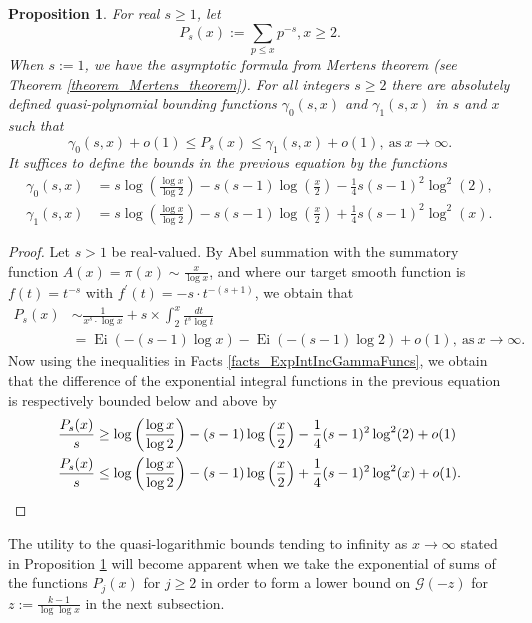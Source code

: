\documentclass[11pt,reqno,a4letter]{article}
\numberwithin{figure}{section}
\numberwithin{table}{section}
\theoremstyle{plain}
\newtheorem{prop}[theorem]{Proposition}
\numberwithin{theorem}{section}
\theoremstyle{definition}
\newcommand{\NBRef}[1]{}
\begin{document}
\begin{prop} 
\label{cor_PartialSumsOfReciprocalsOfPrimePowers} 
For real $s \geq 1$, let 
\[
P_s(x) := \sum_{p \leq x} p^{-s}, x \geq 2. 
\]
When $s := 1$, we have the asymptotic formula from Mertens theorem 
(see Theorem \ref{theorem_Mertens_theorem}). 
For all integers $s \geq 2$ 
there are absolutely defined quasi-polynomial bounding functions 
$\gamma_0(s, x)$ and $\gamma_1(s, x)$ in $s$ and $x$ such that 
\[
\gamma_0(s, x) + o(1) \leq P_s(x) \leq \gamma_1(s, x) + o(1), \mathrm{\ as\ } x \rightarrow \infty. 
\] 
It suffices to define the bounds in the previous equation by the functions 
\begin{align*} 
\gamma_0(s, x) & = s\log\left(\frac{\log x}{\log 2}\right) - 
     s(s-1) \log\left(\frac{x}{2}\right) - 
     \frac{1}{4} s(s-1)^2 \log^2(2), \\ 
\gamma_1(s, x) & = s\log\left(\frac{\log x}{\log 2}\right) - s(s-1) \log\left(\frac{x}{2}\right) + 
     \frac{1}{4} s(s-1)^2 \log^2(x). 
\end{align*}
\end{prop} 
\NBRef{A05-2020-04-26} 
\begin{proof} 
Let $s > 1$ be real-valued. 
By Abel summation with the summatory function 
$A(x) = \pi(x) \sim \frac{x}{\log x}$, and where 
our target smooth function is $f(t) = t^{-s}$ with 
$f^{\prime}(t) = -s \cdot t^{-(s+1)}$, we obtain that 
\begin{align*} 
P_s(x) & \sim \frac{1}{x^s \cdot \log x} + s \times \int_2^{x} \frac{dt}{t^s \log t} \\ 
     & = \operatorname{Ei}(-(s-1) \log x) - \operatorname{Ei}(-(s-1) \log 2) + o(1), 
     \mathrm{\ as\ } x \rightarrow \infty. 
\end{align*} 
Now using the inequalities in Facts \ref{facts_ExpIntIncGammaFuncs}, we obtain that the 
difference of the exponential integral functions in the previous equation 
is respectively bounded below and above by 
\begin{align*} 
\frac{P_s(x)}{s} & \geq \log\left(\frac{\log x}{\log 2}\right) - (s-1) \log\left(\frac{x}{2}\right) - 
     \frac{1}{4} (s-1)^2 \log^2(2) + o(1) \\ 
\frac{P_s(x)}{s} & \leq \log\left(\frac{\log x}{\log 2}\right) - (s-1) \log\left(\frac{x}{2}\right) + 
     \frac{1}{4} (s-1)^2 \log^2(x) + o(1). 
     \qedhere 
\end{align*} 
\end{proof} 

The utility to the quasi-logarithmic bounds tending to 
infinity as $x \rightarrow \infty$ stated in 
Proposition \ref{cor_PartialSumsOfReciprocalsOfPrimePowers} 
will become apparent when we take the exponential of sums of the 
functions $P_j(x)$ for $j \geq 2$ in order to form a lower bound on 
$\mathcal{G}(-z)$ for $z := \frac{k-1}{\log\log x}$ in the 
next subsection. 
\end{document}
